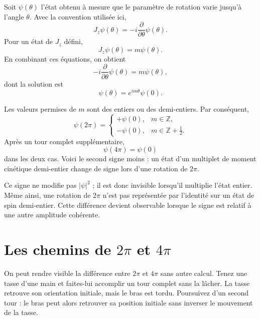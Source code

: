 
Soit \(\psi(\theta)\) l’état obtenu à mesure que le paramètre de rotation varie jusqu’à l’angle \(\theta\). Avec la convention utilisée ici,
\begin{equation}
J_z\psi(\theta)
=
-i\frac{\partial}{\partial\theta}\psi(\theta).
\end{equation}
Pour un état de \(J_z\) défini,
\begin{equation}
J_z\psi(\theta)=m\psi(\theta).
\end{equation}
En combinant ces équations, on obtient
\begin{equation}
-i\frac{\partial}{\partial\theta}\psi(\theta)
=
m\psi(\theta),
\end{equation}
dont la solution est
\begin{equation}
\psi(\theta)=e^{im\theta}\psi(0).
\end{equation}

Les valeurs permises de \(m\) sont des entiers ou des demi-entiers. Par conséquent,
\begin{equation}
\psi(2\pi)
=
\begin{cases}
+\psi(0), & m\in\mathbb Z,\\[4pt]
-\psi(0), & m\in\mathbb Z+\tfrac12.
\end{cases}
\end{equation}
Après un tour complet supplémentaire,
\begin{equation}
\psi(4\pi)=\psi(0)
\end{equation}
dans les deux cas. Voici le second signe moins : un état d’un multiplet de moment cinétique demi-entier change de signe lors d’une rotation de \(2\pi\).

Ce signe ne modifie pas \(\lvert\psi\rvert^2\) ; il est donc invisible lorsqu’il multiplie l’état entier. Même ainsi, une rotation de \(2\pi\) n’est pas représentée par l’identité sur un état de spin demi-entier. Cette différence devient observable lorsque le signe est relatif à une autre amplitude cohérente.

\section{Les chemins de \texorpdfstring{\(2\pi\) et \(4\pi\)}{2 pi et 4 pi}}

On peut rendre visible la différence entre \(2\pi\) et \(4\pi\) sans autre calcul. Tenez une tasse d’une main et faites-lui accomplir un tour complet sans la lâcher. La tasse retrouve son orientation initiale, mais le bras est tordu. Poursuivez d’un second tour : le bras peut alors retrouver sa position initiale sans inverser le mouvement de la tasse.

